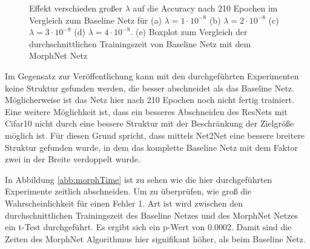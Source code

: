 \begin{figure}

     \caption{Effekt verschieden großer $\lambda$ auf die Accuracy nach 210 Epochen im Vergleich zum Baseline Netz für (a) $\lambda = 1 \cdot 10^{-8}$ (b) $\lambda = 2 \cdot 10^{-8}$ (c) $\lambda = 3 \cdot 10^{-8}$ (d) $\lambda = 4 \cdot 10^{-8}$. (e) Boxplot zum Vergleich der durchschnittlichen Trainingszeit von Baseline Netz mit dem MorphNet Netz}
     \label{abb:morphAcc}
\end{figure}

Im Gegensatz zur Veröffentlichung kann mit den durchgeführten Experimenten keine Struktur gefunden werden, die besser abschneidet als das Baseline Netz. Möglicherweise ist das Netz hier nach 210 Epochen noch nicht fertig trainiert.
Eine weitere Möglichkeit ist, dass ein besseres Abschneiden des ResNets mit Cifar10 nicht durch eine bessere Struktur mit der Beschränkung der Zielgröße möglich ist. Für diesen Grund spricht, dass mittels Net2Net eine bessere breitere Struktur gefunden wurde, in dem das komplette Baseline Netz mit dem Faktor zwei in der Breite verdoppelt wurde. 

In Abbildung \ref{abb:morphTime} ist zu sehen wie die hier durchgeführten Experimente zeitlich abschneiden.  
Um zu überprüfen, wie groß die Wahrscheinlichkeit für einen Fehler 1. Art ist wird zwischen den durchschnittlichen Trainingszeit des Baseline Netzes und des MorphNet Netzes ein t-Test durchgeführt. Es ergibt sich ein p-Wert von 0.0002. Damit sind die Zeiten des MorphNet Algorithmus hier signifikant höher, als beim Baseline Netz. 









